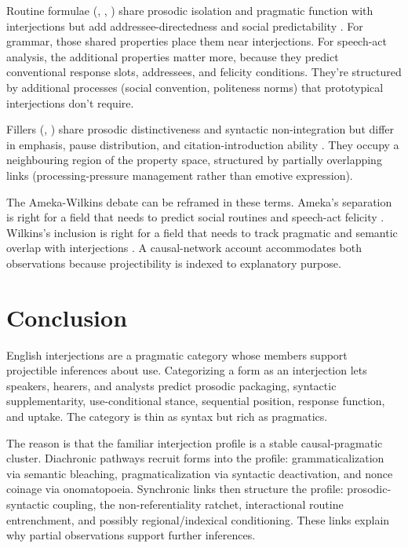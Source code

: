 \documentclass[12pt]{article}
\begin{document}
Routine formulae (, , ) share
prosodic isolation and pragmatic function with interjections but add
addressee-directedness and social predictability
\citep[109--110]{ameka1992}. For grammar, those shared properties place
them near interjections. For speech-act analysis, the additional
properties matter more, because they predict conventional response slots,
addressees, and felicity conditions. They're structured by additional
processes (social convention, politeness norms) that prototypical
interjections don't require.

Fillers (, ) share prosodic distinctiveness and
syntactic non-integration but differ in emphasis, pause distribution,
and citation-introduction ability \citep{oconnell2005}. They occupy a
neighbouring region of the property space, structured by partially
overlapping links (processing-pressure management rather than
emotive expression).

The Ameka-Wilkins debate can be reframed in these terms. Ameka's
separation is right for a field that needs to predict social routines and
speech-act felicity \citep[109]{ameka1992}. Wilkins's inclusion is right
for a field that needs to track pragmatic and semantic overlap with
interjections \citep[142]{wilkins1992}. A causal-network account accommodates both
observations because projectibility is indexed to explanatory purpose.

\section{Conclusion}\label{sec:conclusion}

English interjections are a pragmatic category whose members support
projectible inferences about use. Categorizing a form as an interjection
lets speakers, hearers, and analysts predict prosodic packaging,
syntactic supplementarity, use-conditional stance, sequential position,
response function, and uptake. The category is thin as syntax but rich
as pragmatics.

The reason is that the familiar interjection profile is a stable
causal-pragmatic cluster. Diachronic pathways recruit forms into the
profile: grammaticalization via semantic bleaching, pragmaticalization
via syntactic deactivation, and nonce coinage via onomatopoeia.
Synchronic links then structure the profile: prosodic-syntactic
coupling, the non-referentiality ratchet, interactional routine
entrenchment, and possibly regional/indexical conditioning. These links
explain why partial observations support further inferences.
\end{document}
